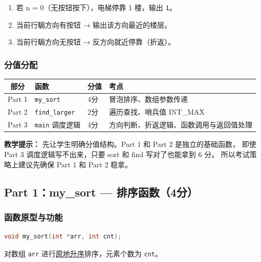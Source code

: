 \begin{enumerate}
    \item 若 n = 0（无按钮按下），电梯停靠 1 楼，输出 \texttt{1}。
    \item 当前行駶方向有按钮 → 输出该方向最近的楼层。
    \item 当前行駶方向无按钮 → 反方向就近停靠（折返）。
\end{enumerate}

\subsubsection{分值分配}

\begin{table}[h]
    \centering
    \begin{tabular}{@{}clll@{}}
        \toprule
        \textbf{部分} & \textbf{函数}                   & \textbf{分值} & \textbf{考点}          \\
        \midrule
        Part 1 & \texttt{my\_sort}         & 4分 & 冒泡排序、数组参数传递          \\
        Part 2 & \texttt{find\_larger}     & 2分 & 遍历查找、哨兵值 INT\_MAX    \\
        Part 3 & \texttt{main} 调度逻辑       & 4分 & 方向判断、折返逻辑、函数调用与返回值处理 \\
        \bottomrule
    \end{tabular}
\end{table}

\textbf{教学提示：} 先让学生明确分值结构。Part 1 和 Part 2 是独立的基础函数，
即使 Part 3 调度逻辑写不出来，只要 sort 和 find 写对了也能拿到 6 分。
所以考试策略上建议先确保 Part 1 和 Part 2 稳拿。

\bigskip
\bigskip

\subsection{Part 1：my\_sort — 排序函数（4分）}

\subsubsection{函数原型与功能}

\begin{lstlisting}[language=C]
void my_sort(int *arr, int cnt);
\end{lstlisting}

对数组 \texttt{arr} 进行\underline{原地升序}排序，元素个数为 \texttt{cnt}。

